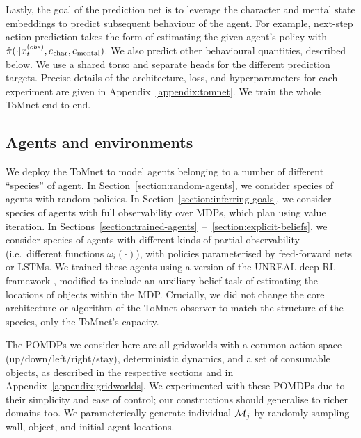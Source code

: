 \documentclass{article}
\begin{document}
Lastly, the goal of the prediction net is to leverage the character and mental state embeddings to predict subsequent behaviour of the agent. For example, next-step action prediction takes the form of estimating the given agent's policy with $\hat{\pi}(\cdot | x_t^{(obs)}, e_{\mathrm{char}}, e_{\mathrm{mental}})$. We also predict other behavioural quantities, described below. We use a shared torso and separate heads for the different prediction targets. Precise details of the architecture, loss, and hyperparameters for each experiment are given in Appendix~\ref{appendix:tomnet}. We train the whole ToMnet end-to-end.

\subsection{Agents and environments}

We deploy the ToMnet to model agents belonging to a number of different ``species'' of agent. In Section~\ref{section:random-agents}, we consider species of agents with random policies. In Section~\ref{section:inferring-goals}, we consider species of agents with full observability over MDPs, which plan using value iteration. In Sections~\ref{section:trained-agents}~--~\ref{section:explicit-beliefs}, we consider species of agents with different kinds of partial observability (i.e.\ different functions $\omega_i(\cdot)$), with policies parameterised by feed-forward nets or LSTMs. We trained these agents using a version of the UNREAL deep RL framework \cite{jaderberg2017reinforcement}, modified to include an auxiliary belief task of estimating the locations of objects within the MDP. Crucially, we did not change the core architecture or algorithm of the ToMnet observer to match the structure of the species, only the ToMnet's capacity.

The POMDPs we consider here are all gridworlds with a common action space (up/down/left/right/stay), deterministic dynamics, and a set of consumable objects, as described in the respective sections and in Appendix~\ref{appendix:gridworlds}. We experimented with these POMDPs due to their simplicity and ease of control; our constructions should generalise to richer domains too. We parameterically generate individual $\mathcal{M}_j$ by randomly sampling wall, object, and initial agent locations.


\end{document}
